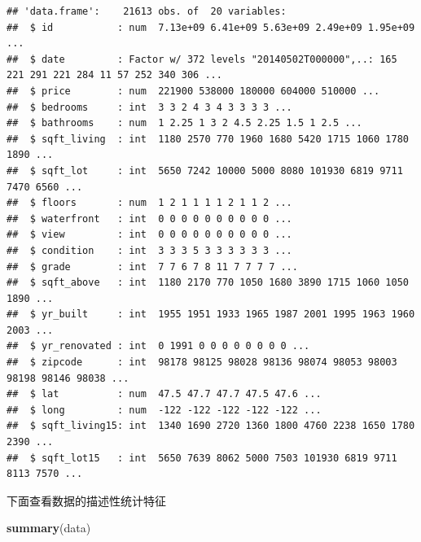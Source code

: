 \documentclass[]{article}
\newenvironment{Shaded}{\begin{snugshade}}{\end{snugshade}}
\newcommand{\KeywordTok}[1]{\textcolor[rgb]{0.13,0.29,0.53}{\textbf{#1}}}
\newcommand{\NormalTok}[1]{#1}
\begin{document}
\begin{verbatim}
## 'data.frame':    21613 obs. of  20 variables:
##  $ id           : num  7.13e+09 6.41e+09 5.63e+09 2.49e+09 1.95e+09 ...
##  $ date         : Factor w/ 372 levels "20140502T000000",..: 165 221 291 221 284 11 57 252 340 306 ...
##  $ price        : num  221900 538000 180000 604000 510000 ...
##  $ bedrooms     : int  3 3 2 4 3 4 3 3 3 3 ...
##  $ bathrooms    : num  1 2.25 1 3 2 4.5 2.25 1.5 1 2.5 ...
##  $ sqft_living  : int  1180 2570 770 1960 1680 5420 1715 1060 1780 1890 ...
##  $ sqft_lot     : int  5650 7242 10000 5000 8080 101930 6819 9711 7470 6560 ...
##  $ floors       : num  1 2 1 1 1 1 2 1 1 2 ...
##  $ waterfront   : int  0 0 0 0 0 0 0 0 0 0 ...
##  $ view         : int  0 0 0 0 0 0 0 0 0 0 ...
##  $ condition    : int  3 3 3 5 3 3 3 3 3 3 ...
##  $ grade        : int  7 7 6 7 8 11 7 7 7 7 ...
##  $ sqft_above   : int  1180 2170 770 1050 1680 3890 1715 1060 1050 1890 ...
##  $ yr_built     : int  1955 1951 1933 1965 1987 2001 1995 1963 1960 2003 ...
##  $ yr_renovated : int  0 1991 0 0 0 0 0 0 0 0 ...
##  $ zipcode      : int  98178 98125 98028 98136 98074 98053 98003 98198 98146 98038 ...
##  $ lat          : num  47.5 47.7 47.7 47.5 47.6 ...
##  $ long         : num  -122 -122 -122 -122 -122 ...
##  $ sqft_living15: int  1340 1690 2720 1360 1800 4760 2238 1650 1780 2390 ...
##  $ sqft_lot15   : int  5650 7639 8062 5000 7503 101930 6819 9711 8113 7570 ...
\end{verbatim}


下面查看数据的描述性统计特征

\begin{Shaded}
\begin{Highlighting}[]
\KeywordTok{summary}\NormalTok{(data)}
\end{Highlighting}
\end{Shaded}
\end{document}
